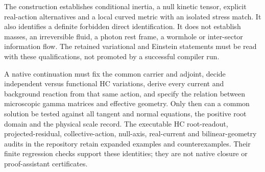 The construction establishes conditional inertia, a null kinetic
tensor, explicit real-action alternatives and a local curved metric
with an isolated stress match. It also identifies a definite forbidden
direct identification. It does not establish masses, an irreversible
fluid, a photon rest frame, a wormhole or inter-sector information flow.
The retained variational and Einstein statements must be read with
these qualifications, not promoted by a successful compiler run.

A native continuation must fix the common carrier and adjoint, decide
independent versus functional HC variations, derive every current and
background reaction from that same action, and specify the relation
between microscopic gamma matrices and effective geometry. Only then
can a common solution be tested against all tangent and normal
equations, the positive root domain and the physical scale record.
The executable HC root-readout, projected-residual, collective-action,
null-axis, real-current and bilinear-geometry audits in the repository
retain expanded examples and counterexamples. Their finite regression
checks support these identities; they are not native closure or
proof-assistant certificates.
